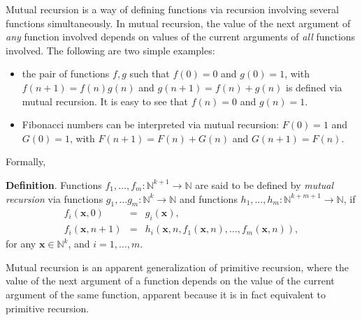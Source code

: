 \documentclass[12pt]{article}
\begin{document}
Mutual recursion is a way of defining functions via recursion involving several functions simultaneously.  In mutual recursion, the value of the next argument of \emph{any} function involved depends on values of the current arguments of \emph{all} functions involved.  The following are two simple examples:
\begin{itemize}
\item the pair of functions $f,g$ such that $f(0)=0$ and $g(0)=1$, with $f(n+1)=f(n)g(n)$ and $g(n+1)=f(n)+g(n)$ is defined via mutual recursion.  It is easy to see that $f(n)=0$ and $g(n)=1$.
\item Fibonacci numbers can be interpreted via mutual recursion: $F(0)=1$ and $G(0)=1$, with $F(n+1)=F(n)+G(n)$ and $G(n+1)=F(n)$.
\end{itemize}

Formally,

\textbf{Definition}.  Functions $f_1,\ldots, f_m: \mathbb{N}^{k+1} \to \mathbb{N}$ are said to be defined by \emph{mutual recursion} via functions $g_1,\ldots g_m: \mathbb{N}^k \to \mathbb{N}$ and functions $h_1,\ldots, h_m: \mathbb{N}^{k+m+1} \to \mathbb{N}$, if 
\begin{eqnarray*}
f_i(\boldsymbol{x},0) &=& g_i(\boldsymbol{x}), \\
f_i(\boldsymbol{x},n+1) &=& h_i(\boldsymbol{x},n,f_1(\boldsymbol{x},n),\ldots, f_m(\boldsymbol{x},n)),
\end{eqnarray*}
for any $\boldsymbol{x}\in \mathbb{N}^k$, and $i=1,\ldots, m$.

Mutual recursion is an apparent generalization of primitive recursion, where the value of the next argument of a function depends on the value of the current argument of the same function, apparent because it is in fact equivalent to primitive recursion.
\end{document}

